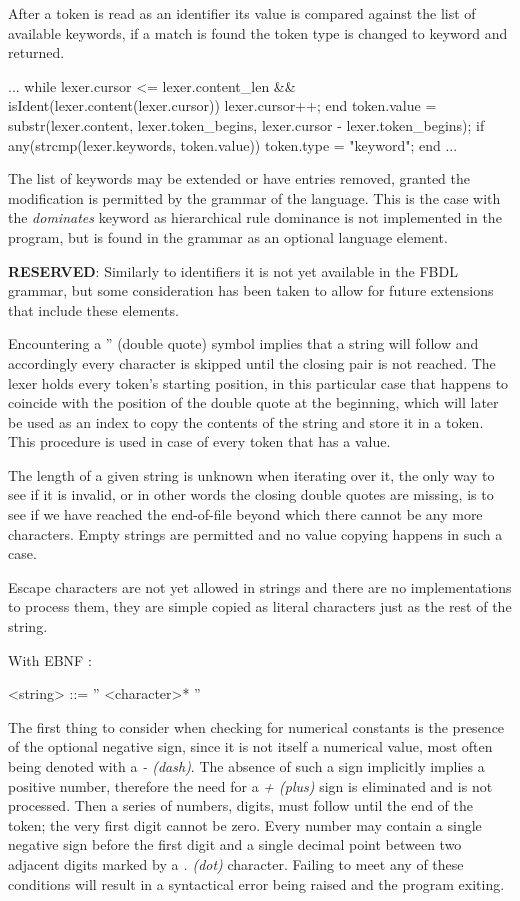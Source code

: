 After a token is read as an identifier its value is compared against the list of available keywords, if a match is found the token type is changed to keyword and returned.

\begin{octave}
...
while lexer.cursor <= lexer.content_len &&
		isIdent(lexer.content(lexer.cursor))
  lexer.cursor++;
end
token.value = substr(lexer.content, lexer.token_begins,
		lexer.cursor - lexer.token_begins);
if any(strcmp(lexer.keywords, token.value))
  token.type = "keyword";
end
...
\end{octave}

The list of keywords may be extended or have entries removed, granted the modification is permitted by the grammar of the language. This is the case with the \textit{dominates} keyword as hierarchical rule dominance is not implemented in the program, but is found in the grammar as an optional language element.

\textbf{RESERVED}: Similarly to identifiers it is not yet available in the FBDL grammar, but some consideration has been taken to allow for future extensions that include these elements.

Encountering a '' (double quote) symbol implies that a string will follow and accordingly every character is skipped until the closing pair is not reached. The lexer holds every token's starting position, in this particular case that happens to coincide with the position of the double quote at the beginning, which will later be used as an index to copy the contents of the string and store it in a token. This procedure is used in case of every token that has a value.

The length of a given string is unknown when iterating over it, the only way to see if it is invalid, or in other words the closing double quotes are missing, is to see if we have reached the end-of-file beyond which there cannot be any more characters. Empty strings are permitted and no value copying happens in such a case.

Escape characters are not yet allowed in strings and there are no implementations to process them, they are simple copied as literal characters just as the rest of the string.

With EBNF :
\begin{grammar}
<string> ::= '' <character>* ''
\end{grammar}

The first thing to consider when checking for numerical constants is the presence of the optional negative sign, since it is not itself a numerical value, most often being denoted with a \textit{- (dash)}. The absence of such a sign implicitly implies a positive number, therefore the need for a \textit{+ (plus)} sign is eliminated and is not processed. Then a series of numbers, digits, must follow until the end of the token; the very first digit cannot be zero. Every number may contain a single negative sign before the first digit and a single decimal point between two adjacent digits marked by a \textit{. (dot)} character. Failing to meet any of these conditions will result in a syntactical error being raised and the program exiting.


